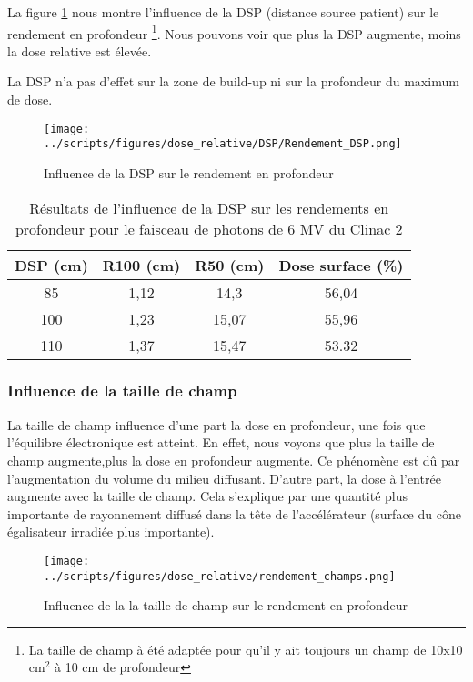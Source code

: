 \documentclass{article}
\begin{document}
La figure \ref*{fig_rdt_dsp} nous montre l'influence de la DSP (distance source patient) sur le rendement en profondeur \footnote{La taille de champ à été adaptée pour qu'il y ait toujours un champ de 10x10 cm$^2$ à 10 cm de profondeur}. Nous pouvons voir que plus la DSP augmente, moins la dose relative est élevée.

La DSP n'a pas d'effet sur la zone de build-up ni sur la profondeur du maximum de dose.

\begin{figure}[h]
  \centering
  \texttt{[image: ../scripts/figures/dose\_relative/DSP/Rendement\_DSP.png]}
  \caption{Influence de la DSP sur le rendement en profondeur}
  \label{fig_rdt_dsp}
\end{figure}

\begin{table}[h]
  \centering
  \begin{tabular}{cccc}
    \toprule
    \textbf{DSP (cm)} & \textbf{R100 (cm)} & \textbf{R50 (cm)} & \textbf{Dose surface (\%)} \\
    \toprule
    85 & 1,12 & 14,3 & 56,04 \\
    100 & 1,23 & 15,07 & 55,96 \\
    110 & 1,37 & 15,47 & 53.32 \\
    \bottomrule
  \end{tabular}
  \caption{Résultats de l'influence de la DSP sur les rendements en profondeur pour le faisceau de photons de 6 MV du Clinac 2}
  \label{table_rdt_dsp}
\end{table}

\subsubsection{Influence de la taille de champ}

La taille de champ influence d'une part la dose en profondeur, une fois que l'équilibre électronique est atteint. En effet, nous voyons que plus la taille de champ augmente,plus la dose en profondeur augmente. Ce phénomène est dû par l'augmentation du volume du milieu diffusant. D'autre part, la dose à l'entrée augmente avec la taille de champ. Cela s'explique par une quantité plus importante de rayonnement diffusé dans la tête de l'accélérateur (surface du cône égalisateur irradiée plus importante).

\begin{figure}[h]
  \centering
  \texttt{[image: ../scripts/figures/dose\_relative/rendement\_champs.png]}
  \caption{Influence de la la taille de champ sur le rendement en profondeur}
  \label{fig_rdt_champ}
\end{figure}
\end{document}
